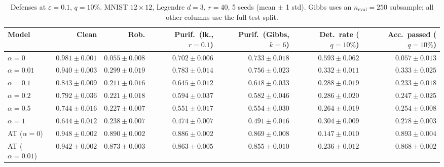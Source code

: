 \begin{table}[htbp]
  \centering
  \small
  \begin{tabular}{@{}lrrrrrr@{}}
    \toprule
    Model & Clean & Rob. & Purif.\ (lk., $r{=}0.1$) & Purif.\ (Gibbs, $k{=}6$) & Det.\ rate ($q{=}10\%$) & Acc.\ passed ($q{=}10\%$) \\
    \midrule
    $\alpha{=}0$ & $\mathbf{0.981 \pm 0.001}$ & $0.055 \pm 0.008$ & $0.702 \pm 0.006$ & $0.733 \pm 0.018$ & $\mathbf{0.593 \pm 0.062}$ & $0.057 \pm 0.013$ \\
    $\alpha{=}0.01$ & $0.940 \pm 0.003$ & $0.299 \pm 0.019$ & $0.783 \pm 0.014$ & $0.756 \pm 0.023$ & $0.332 \pm 0.011$ & $0.333 \pm 0.025$ \\
    $\alpha{=}0.1$ & $0.843 \pm 0.009$ & $0.211 \pm 0.016$ & $0.645 \pm 0.012$ & $0.618 \pm 0.033$ & $0.288 \pm 0.019$ & $0.233 \pm 0.018$ \\
    $\alpha{=}0.2$ & $0.792 \pm 0.036$ & $0.221 \pm 0.018$ & $0.594 \pm 0.037$ & $0.582 \pm 0.046$ & $0.286 \pm 0.020$ & $0.247 \pm 0.025$ \\
    $\alpha{=}0.5$ & $0.744 \pm 0.016$ & $0.227 \pm 0.007$ & $0.551 \pm 0.017$ & $0.554 \pm 0.030$ & $0.264 \pm 0.019$ & $0.254 \pm 0.008$ \\
    $\alpha{=}1$ & $0.644 \pm 0.012$ & $0.238 \pm 0.007$ & $0.474 \pm 0.007$ & $0.491 \pm 0.016$ & $0.304 \pm 0.009$ & $0.278 \pm 0.003$ \\
    AT ($\alpha{=}0$) & $0.948 \pm 0.002$ & $\mathbf{0.890 \pm 0.002}$ & $\mathbf{0.886 \pm 0.002}$ & $\mathbf{0.869 \pm 0.008}$ & $0.147 \pm 0.010$ & $\mathbf{0.893 \pm 0.004}$ \\
    AT ($\alpha{=}0.01$) & $0.942 \pm 0.002$ & $0.873 \pm 0.003$ & $0.863 \pm 0.005$ & $0.855 \pm 0.010$ & $0.236 \pm 0.012$ & $0.868 \pm 0.002$ \\
    \bottomrule
  \end{tabular}
  \caption{Defenses at $\varepsilon=0.1$, $q{=}10\%$. MNIST $12\times12$, Legendre $d{=}3$, $r{=}40$, 5 seeds (mean $\pm$ 1 std). Gibbs uses an $n_{\mathrm{eval}}=250$ subsample; all other columns use the full test split.}
  \label{tab:mnist_r12_models_r40_eps0.1}
\end{table}
